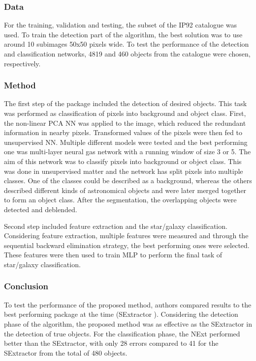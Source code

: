 \subsubsection{Data}
For the training, validation and testing, the subset of the IP92  catalogue \cite{1992ApJS} was used. To train the detection part of the algorithm, the best solution was to use around 10 subimages 50x50 pixels wide. To test the performance of the detection and classification networks, 4819 and 460 objects from the catalogue were chosen, respectively.

\subsubsection{Method}
The first step of the package included the detection of desired objects. This task was performed as classification of pixels into background and object class. First, the non-linear PCA NN was applied to the image, which reduced the redundant information in nearby pixels. Transformed values of the pixels were then fed to unsupervised NN. Multiple different models were tested and the best performing one was multi-layer neural gas network with a running window of size 3 or 5. 
The aim of this network was to classify pixels into background or object class. This was done in unsupervised matter and the network has split pixels into multiple classes. One of the classes could be described as a background, whereas the others described different kinds of astronomical objects and were later merged together to form an object class. After the segmentation, the overlapping objects were detected and deblended.

Second step included feature extraction and the star/galaxy classification. Considering feature extraction, multiple features were measured and through the sequential backward elimination strategy, the best performing ones were selected. These features were then used to train MLP to perform the final task of star/galaxy classification. 

\subsubsection{Conclusion}
To test the performance of the proposed method, authors compared results to the best performing package at the time (SExtractor \cite{sextractor}). Considering the detection phase of the algorithm, the proposed method was as effective as the SExtractor in the detection of true objects. For the classification phase, the NExt performed better than the SExtractor, with only 28 errors compared to 41 for the SExtractor from the total of 480 objects. 

